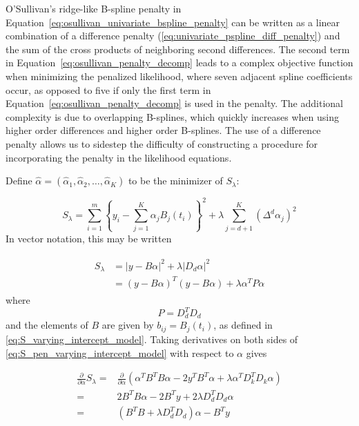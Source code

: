\documentclass[12pt]{article}
\begin{document}
O'Sullivan's ridge-like B-spline penalty in Equation~\ref{eq:osullivan_univariate_bspline_penalty} can be written as a linear combination of a difference penalty (\ref{eq:univariate_pspline_diff_penalty}) and the sum of the cross products of neighboring second differences. The second term in Equation~\ref{eq:osullivan_penalty_decomp} leads to a complex objective function when minimizing the penalized likelihood, where seven adjacent spline coefficients occur, as opposed to five if only the first term in Equation~\ref{eq:osullivan_penalty_decomp} is used in the penalty. The additional complexity is due to overlapping B-splines, which quickly increases when using higher order differences and higher order B-splines. The use of a difference penalty allows us to sidestep the difficulty of constructing a procedure for incorporating the penalty in the likelihood equations. 

Define $\hat{\alpha} = \left(\hat{\alpha}_1, \hat{\alpha}_2, \dots, \hat{\alpha}_K \right)$ to be the minimizer of $S_\lambda$:

\begin{equation*}  
S_\lambda = \sum_{i=1}^m \left\{ y_i - \sum_{j=1}^K \alpha_j B_j\left(t_i\right) \right\}^2 + \lambda \sum_{j=d+1}^K \left( \Delta^d\alpha_j \right)^2
\end{equation*}
\noindent
In vector notation, this may be written

\begin{align}
\begin{split}
S_\lambda &= \vert y- B\alpha  \vert^2  + \lambda \vert D_d \alpha\vert^2 \\
&=  \left( y- B\alpha  \right)^T \left( y-B \alpha\right) + \lambda \alpha^T P \alpha
\end{split} \label{eq:S_pen_varying_intercept_model}
\end{align}
\noindent
where 
\[
P = D_d^T D_d
\]
\noindent
and the elements of $B$ are given by $b_{ij} = B_j\left(t_i\right)$, as defined in \ref{eq:S_varying_intercept_model}. Taking derivatives on both sides of \ref{eq:S_pen_varying_intercept_model} with respect to $\alpha$ gives

\begin{align}
\frac{\partial}{\partial \alpha}S_\lambda ={} & \frac{\partial}{\partial \alpha}\left(\alpha^TB^TB \alpha -2y^T B^T\alpha+\lambda \alpha^T D_k^T D_k \alpha  \right) \nonumber \\
= {} & 2B^TB \alpha - 2B^T y + 2\lambda D_d^TD_d\alpha \nonumber\\
= {} & \left(B^T B +  \lambda D_d^TD_d\right)\alpha - B^T y \label{eq:dSlambda_dAlpha}
\end{align} 
\noindent
\end{document}
